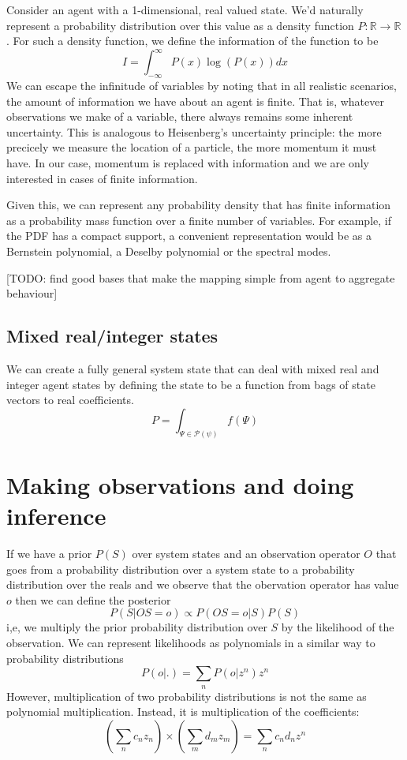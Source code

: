 \documentclass[letterpaper,twocolumn,10pt]{article}
\begin{document}
Consider an agent with a 1-dimensional, real valued state. We'd naturally represent a probability distribution over this value as a density function $P:\mathbb{R} \rightarrow \mathbb{R}$. For such a density function, we define the information of the function to be
\[
I = \int_{-\infty}^\infty P(x) \log(P(x)) dx
\]
We can escape the infinitude of variables by noting that in all realistic scenarios, the amount of information we have about an agent is finite. That is, whatever observations we make of a variable, there always remains some inherent uncertainty. This is analogous to Heisenberg's uncertainty principle: the more precicely we measure the location of a particle, the more momentum it must have. In our case, momentum is replaced with information and we are only interested in cases of finite information.

Given this, we can represent any probability density that has finite information as a probability mass function over a finite number of variables. For example, if the PDF has a compact support, a convenient representation would be as a Bernstein polynomial, a Deselby polynomial or the spectral modes.

[TODO: find good bases that make the mapping simple from agent to aggregate behaviour]

\subsection{Mixed real/integer states}
 We can create a fully general system state that can deal with mixed real and integer agent states by defining the state to be a function from bags of state vectors to real coefficients.
 \[
 P = \int_{\Psi\in\mathcal{P}(\psi)} f(\Psi)
 \]

\section{Making observations and doing inference}

If we have a prior $P(S)$ over system states and an observation operator $O$ that goes from a probability distribution over a system state to a probability distribution over the reals and we observe that the obervation operator has value $o$ then we can define the posterior
\[
P(S|OS = o) \propto P(OS=o|S)P(S)
\]
i,e, we multiply the prior probability distribution over $S$ by the likelihood of the observation. We can represent likelihoods as polynomials in a similar way to probability distributions
\[
P(o|.) = \sum_n P(o|z^n)z^n
\]
However, multiplication of two probability distributions is not the same as polynomial multiplication. Instead, it is multiplication of the coefficients:
\[
\left(\sum_n c_n z_n\right) \times \left(\sum_m d_mz_m\right) = \sum_n c_nd_nz^n
\]
\end{document}
